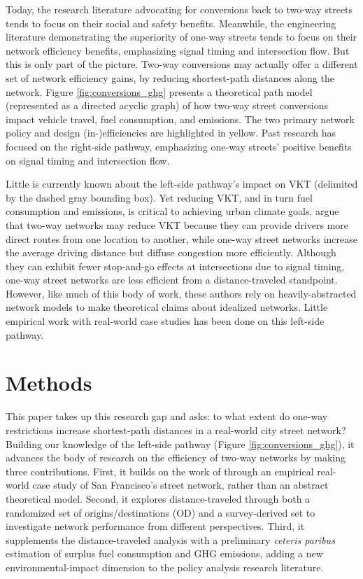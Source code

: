 \documentclass{trbunofficial}
\begin{document}
Today, the research literature advocating for conversions back to two-way streets tends to focus on their social and safety benefits. Meanwhile, the engineering literature demonstrating the superiority of one-way streets tends to focus on their network efficiency benefits, emphasizing signal timing and intersection flow. But this is only part of the picture. Two-way conversions may actually offer a different set of network efficiency gains, by reducing shortest-path distances along the network. Figure \ref{fig:conversions_ghg} presents a theoretical path model (represented as a directed acyclic graph) of how two-way street conversions impact vehicle travel, fuel consumption, and emissions. The two primary network policy and design (in-)efficiencies are highlighted in yellow. Past research has focused on the right-side pathway, emphasizing one-way streets' positive benefits on signal timing and intersection flow.

Little is currently known about the left-side pathway's impact on VKT (delimited by the dashed gray bounding box). Yet reducing VKT, and in turn fuel consumption and emissions, is critical to achieving urban climate goals. \citet{ortigosa_analysis_2019} argue that two-way networks may reduce VKT because they can provide drivers more direct routes from one location to another, while one-way street networks increase the average driving distance but diffuse congestion more efficiently. Although they can exhibit fewer stop-and-go effects at intersections due to signal timing, one-way street networks are less efficient from a distance-traveled standpoint. However, like much of this body of work, these authors rely on heavily-abstracted network models to make theoretical claims about idealized networks. Little empirical work with real-world case studies has been done on this left-side pathway. 

\section{Methods}

This paper takes up this research gap and asks: to what extent do one-way restrictions increase shortest-path distances in a real-world city street network? Building our knowledge of the left-side pathway (Figure \ref{fig:conversions_ghg}), it advances the body of research on the efficiency of two-way networks by making three contributions. First, it builds on the work of \citet{ortigosa_analysis_2019} through an empirical real-world case study of San Francisco's street network, rather than an abstract theoretical model. Second, it explores distance-traveled through both a randomized set of origins/destinations (OD) and a survey-derived set to investigate network performance from different perspectives. Third, it supplements the distance-traveled analysis with a preliminary \textit{ceteris paribus} estimation of surplus fuel consumption and GHG emissions, adding a new environmental-impact dimension to the policy analysis research literature.
\end{document}
